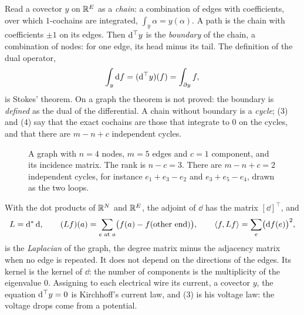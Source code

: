 \begin{notechapter}
\begin{keyidea}
Read a covector $y$ on $\mathbb{R}^E$ as a \emph{chain}: a combination of
edges with coefficients, over which $1$-cochains are integrated,
$\int_y\alpha = y(\alpha)$. A path is the chain with coefficients
$\pm1$ on its edges. Then $\mathrm{d}^{\top} y$ is the \emph{boundary} of the
chain, a combination of nodes: for one edge, its head minus its tail.
The definition of the dual operator,
\[
  \int_y\mathrm{d} f = (\mathrm{d}^{\top} y)(f) = \int_{\partial y}f ,
\]
is Stokes' theorem. On a graph the theorem is not proved: the boundary
is \emph{defined} as the dual of the differential. A chain without
boundary is a \emph{cycle}; (3) and (4) say that the exact cochains are
those that integrate to $0$ on the cycles, and that there are
$m - n + c$ independent cycles.
\end{keyidea}

\begin{figure}[ht]
\centering
{}
\caption{A graph with $n = 4$ nodes, $m = 5$ edges and $c = 1$
component, and its incidence matrix. The rank is $n - c = 3$. There are
$m - n + c = 2$ independent cycles, for instance
$e_1 + e_3 - e_2$ and $e_3 + e_5 - e_4$, drawn as the two loops.}
\label{stokes:fig:graph}
\end{figure}

With the dot products of $\mathbb{R}^N$ and $\mathbb{R}^E$, the adjoint of $\dd$ has
the matrix $[\dd]^\top$, and
\[
  L = \mathrm{d}^{*}\,\mathrm{d} , \qquad
  (Lf)(a) = \sum_{e\text{ at }a}\bigl(f(a) - f(\text{other end})\bigr) ,
  \qquad
  \left\langle f, Lf \right\rangle = \sum_e\bigl(\mathrm{d} f(e)\bigr)^2 ,
\]
is the \emph{Laplacian} of the graph, the degree matrix minus the
adjacency matrix when no edge is repeated. It does not depend on the
directions of the edges. Its kernel is the kernel of $\dd$: the number
of components is the multiplicity of the eigenvalue $0$. Assigning to
each electrical wire its current, a covector $y$, the equation
$\mathrm{d}^{\top} y = 0$ is Kirchhoff's current law, and (3) is his voltage
law: the voltage drops come from a potential.


\end{notechapter}
